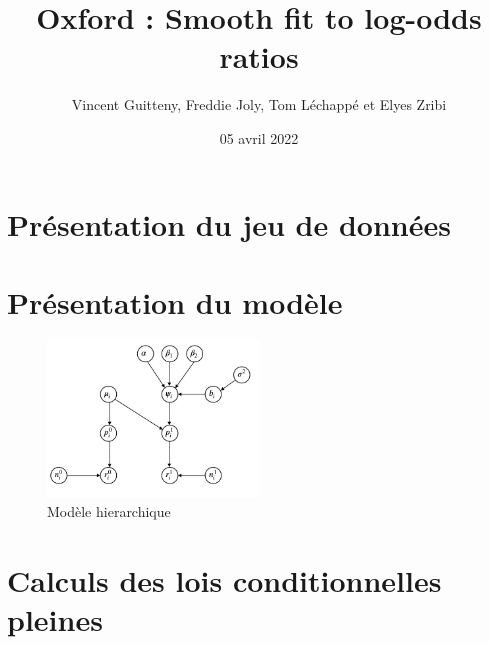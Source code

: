 \documentclass[
]{article}
\title{Oxford : Smooth fit to log-odds ratios}
\author{Vincent Guitteny, Freddie Joly, Tom Léchappé et Elyes Zribi}
\date{05 avril 2022}
\begin{document}
\maketitle

\newenvironment{cols}[1][]{}{}
\newenvironment{col}[1]{\begin{minipage}{#1}\ignorespaces}{%
\end{minipage}
\ifhmode\unskip\fi
\aftergroup\useignorespacesandallpars}
\def\useignorespacesandallpars#1\ignorespaces\fi{%
#1\fi\ignorespacesandallpars}
\makeatletter
\def\ignorespacesandallpars{%
  \@ifnextchar\par
    {\expandafter\ignorespacesandallpars\@gobble}%
    {}%
}
\makeatother

\renewcommand\contentsname{Table des matières}
\newpage
\tableofcontents
\newpage

\hypertarget{pruxe9sentation-du-jeu-de-donnuxe9es}{%
\section{Présentation du jeu de
données}\label{pruxe9sentation-du-jeu-de-donnuxe9es}}

\hypertarget{pruxe9sentation-du-moduxe8le}{%
\section{Présentation du modèle}\label{pruxe9sentation-du-moduxe8le}}

\begin{figure}
\centering
\includegraphics[width=0.5\textwidth,height=\textheight]{Model.jpg}
\caption{Modèle hierarchique}
\end{figure}

\hypertarget{calculs-des-lois-conditionnelles-pleines}{%
\section{Calculs des lois conditionnelles
pleines}\label{calculs-des-lois-conditionnelles-pleines}}
\end{document}
